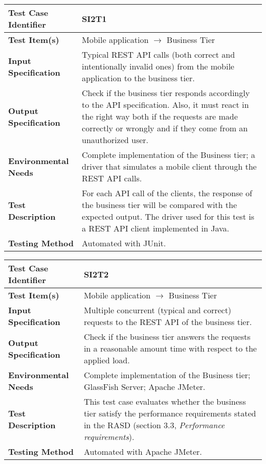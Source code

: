 \begin{tabular}{l p{}}
    \hline
    \textbf{Test Case Identifier} & SI2T1\\
    \hline
    \textbf{Test Item(s)} & Mobile application $\rightarrow$ Business Tier\\
    \hline
    \textbf{Input Specification} & Typical REST API calls (both correct and intentionally invalid ones) from the mobile application to the business tier.\\
    \hline
    \textbf{Output Specification} & Check if the business tier responds accordingly to the API specification. Also, it must react in the right way both if the requests are made correctly or wrongly and if they come from an unauthorized user.\\
    \hline
    \textbf{Environmental Needs} & Complete implementation of the Business tier; a driver that simulates a mobile client through the REST API calls. \\
    \hline
    \textbf{Test Description} & For each API call of the clients, the response of the business tier will be compared with the expected output. The driver used for this test is a REST API client implemented in Java.\\
    \hline
    \textbf{Testing Method} & Automated with JUnit.\\
    \hline
\end{tabular}

\vspace{2em}

\noindent\begin{tabular}{l p{}}
    \hline
    \textbf{Test Case Identifier} & SI2T2\\
    \hline
    \textbf{Test Item(s)} & Mobile application $\rightarrow$ Business Tier\\
    \hline
    \textbf{Input Specification} & Multiple concurrent (typical and correct) requests to the REST API of the business tier.\\
    \hline
    \textbf{Output Specification} & Check if the business tier answers the requests in a reasonable amount time with respect to the applied load. \\
    \hline
    \textbf{Environmental Needs} & Complete implementation of the Business tier; GlassFish Server; Apache JMeter.\\
    \hline
    \textbf{Test Description} & This test case evaluates whether the business tier satisfy the performance requirements stated in the RASD (section 3.3, \emph{Performance requirements}).\\
    \hline
    \textbf{Testing Method} & Automated with Apache JMeter. \\
    \hline
\end{tabular}


